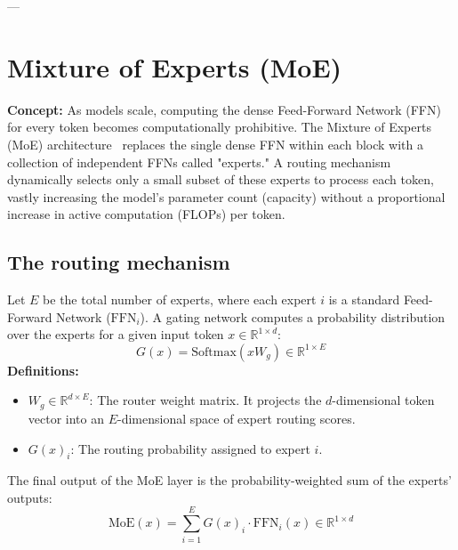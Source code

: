 \documentclass[11pt]{article}
\begin{document}
	---
	
	\section{Mixture of Experts (MoE)}
	\textbf{Concept:} As models scale, computing the dense Feed-Forward Network (FFN) for every token becomes computationally prohibitive. The Mixture of Experts (MoE) architecture~\cite{shazeer2017outrageously} replaces the single dense FFN within each block with a collection of independent FFNs called "experts." A routing mechanism dynamically selects only a small subset of these experts to process each token, vastly increasing the model's parameter count (capacity) without a proportional increase in active computation (FLOPs) per token.
	
	\subsection{The routing mechanism}
	Let $E$ be the total number of experts, where each expert $i$ is a standard Feed-Forward Network ($\text{FFN}_i$).
	A gating network computes a probability distribution over the experts for a given input token $x \in \mathbb{R}^{1 \times d}$:
	\begin{equation}
		G(x) = \text{Softmax}(x W_g) \in \mathbb{R}^{1 \times E}
	\end{equation}
	\textbf{Definitions:}
	\begin{itemize}
		\item $W_g \in \mathbb{R}^{d \times E}$: The router weight matrix. It projects the $d$-dimensional token vector into an $E$-dimensional space of expert routing scores.
		\item $G(x)_i$: The routing probability assigned to expert $i$.
	\end{itemize}
	The final output of the MoE layer is the probability-weighted sum of the experts' outputs:
	\begin{equation}
		\text{MoE}(x) = \sum_{i=1}^{E} G(x)_i \cdot \text{FFN}_i(x) \in \mathbb{R}^{1 \times d}
	\end{equation}
	
\end{document}
